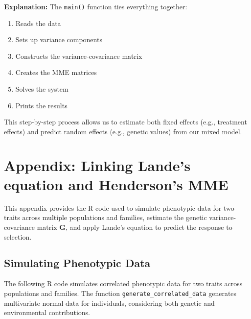 \documentclass[12pt,a4paper]{article}
\begin{document}
\textbf{Explanation:}
The \texttt{main()} function ties everything together:
\begin{enumerate}
  \item Reads the data
  \item Sets up variance components
  \item Constructs the variance-covariance matrix
  \item Creates the MME matrices
  \item Solves the system
  \item Prints the results
\end{enumerate}

This step-by-step process allows us to estimate both fixed effects (e.g., treatment effects) and predict random effects (e.g., genetic values) from our mixed model.

\section*{Appendix: Linking Lande's equation and Henderson's MME}

This appendix provides the R code used to simulate phenotypic data for two traits across multiple populations and families, estimate the genetic variance-covariance matrix \( \mathbf{G} \), and apply Lande's equation to predict the response to selection.

\subsection*{Simulating Phenotypic Data}

The following R code simulates correlated phenotypic data for two traits across populations and families. The function \texttt{generate\_correlated\_data} generates multivariate normal data for individuals, considering both genetic and environmental contributions.
\end{document}
